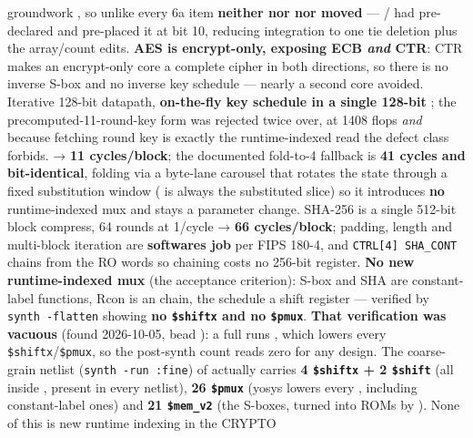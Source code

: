 \begin{record}
\begin{enumerate}
  groundwork , so unlike every 6a item \textbf{neither
   nor  nor 
  moved} --- / had pre-declared
   and pre-placed it at  bit 10,
  reducing integration to one tie deletion plus the
  array/\allowbreak{}count edits. \textbf{AES is encrypt-only, exposing
  ECB \emph{and} CTR}: CTR makes an encrypt-only core a complete cipher
  in both directions, so there is no inverse S-box and no inverse key
  schedule --- nearly a second core avoided. Iterative 128-bit datapath,
  \textbf{on-the-fly key schedule in a single 128-bit }; the
  precomputed-11-round-key form was rejected twice over, at 1408 flops
  \emph{and} because fetching round key  is exactly the
  runtime-indexed read the  defect class forbids.
   → \textbf{11 cycles/\allowbreak{}block}; the
  documented fold-to-4 fallback is \textbf{41 cycles and bit-identical},
  folding via a byte-lane carousel that rotates the state through a
  fixed substitution window ( is always the substituted
  slice) so it introduces \textbf{no} runtime-indexed mux and stays a
  parameter change. SHA-256 is a single 512-bit block compress, 64
  rounds at 1/cycle → \textbf{66 cycles/\allowbreak{}block}; padding,
  length and multi-block iteration are
  \textbf{software\textquotesingle s job} per FIPS 180-4, and
  \texttt{CTRL[4]\ SHA\_\allowbreak{}CONT} chains from the RO
   words so chaining costs no 256-bit register. \textbf{No
  new runtime-indexed mux} (the  acceptance criterion): S-box
  and SHA  are constant-label  functions, Rcon is an
   chain, the  schedule a shift register ---
  verified by \texttt{synth\ -\allowbreak{}flatten} showing \textbf{no
  \texttt{\$shiftx} and no \texttt{\$pmux}}. \warn{} \textbf{That
  verification was vacuous} (found 2026-10-05, bead ): a
  full  runs , which lowers every
  \texttt{\$shiftx}/\texttt{\$pmux}, so the post-synth count reads zero
  for any design. The coarse-grain netlist
  (\texttt{synth\ -\allowbreak{}run\ :\allowbreak{}fine}) of
   actually carries \textbf{4 \texttt{\$shiftx} + 2
  \texttt{\$shift}} (all inside , present in
  every netlist), \textbf{26 \texttt{\$pmux}} (yosys  lowers
  every , including constant-label ones) and \textbf{21
  \texttt{\$mem\_\allowbreak{}v2}} (the S-boxes, turned into ROMs by
  ). None of this is new runtime indexing in the CRYPTO

\end{enumerate}
\end{record}
